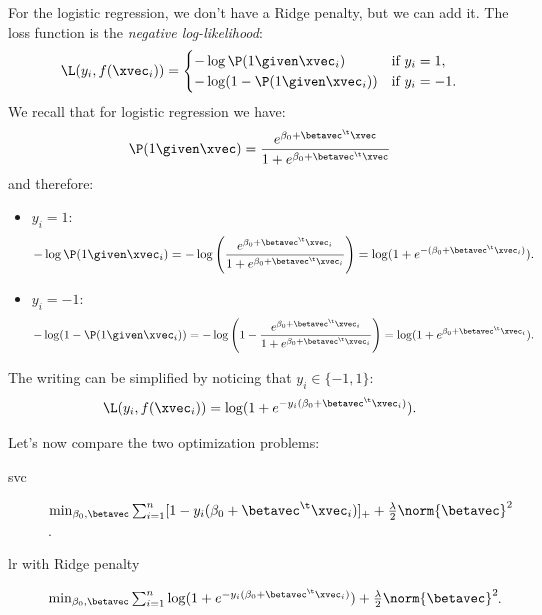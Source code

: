 For the logistic regression, we don't have a Ridge penalty, but we can add it. The loss function is the \emph{negative log-likelihood}:
\begin{equation}
    \L(y_i, f(\xvec_i)) = \begin{cases}
        -\log\P(1 \given \xvec_i)       & \text{if } y_i = 1,  \\
        -\log(1 - \P(1 \given \xvec_i)) & \text{if } y_i = -1.
    \end{cases}
\end{equation}
We recall that for logistic regression we have:
\begin{equation}
    \P(1 \given \xvec) = \frac{e^{\beta_0 + \betavec^\t\xvec}}{1 + e^{\beta_0 + \betavec^\t\xvec}}
\end{equation}
and therefore:
\begin{itemize}[beginpenalty=10000]
    \item $y_i = 1$:
          \begin{equation}
              -\log\P(1 \given \xvec_i) = -\log\left(\frac{e^{\beta_0 + \betavec^\t\xvec_i}}{1 + e^{\beta_0 + \betavec^\t\xvec_i}}\right) = \log(1 + e^{-(\beta_0 + \betavec^\t\xvec_i)}).
          \end{equation}
    \item $y_i = -1$:
          \begin{equation}
              -\log(1 - \P(1 \given \xvec_i)) = -\log\left(1 - \frac{e^{\beta_0 + \betavec^\t\xvec_i}}{1 + e^{\beta_0 + \betavec^\t\xvec_i}}\right) = \log(1 + e^{\beta_0 + \betavec^\t\xvec_i}).
          \end{equation}
\end{itemize}
The writing can be simplified by noticing that $y_i \in \{-1, 1\}$:
\begin{equation}
    \L(y_i, f(\xvec_i)) = \log(1 + e^{-y_i(\beta_0 + \betavec^\t\xvec_i)}).
\end{equation}

Let's now compare the two optimization problems:
\begin{description}
    \item[\acs{svc}] $\min_{\beta_0, \betavec} \sum_{i=1}^n [1 - y_i(\beta_0 + \betavec^\t\xvec_i)]_+ + \frac{\lambda}{2}\norm{\betavec}^2\negthinspace$.
    \item[\acs{lr} with Ridge penalty] $\min_{\beta_0, \betavec} \sum_{i=1}^n \log(1 + e^{-y_i(\beta_0 + \betavec^\t\xvec_i)}) + \frac{\lambda}{2}\norm{\betavec}^2\negthinspace$.
\end{description}

